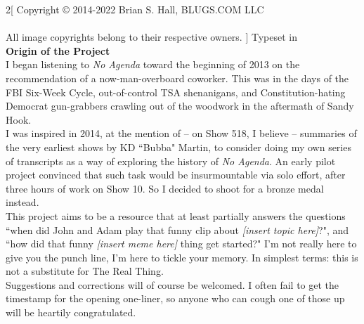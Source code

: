 \begin{multicols*}{2}[
Copyright © 2014-2022 Brian S. Hall, BLUGS.COM LLC\\\\
All image copyrights belong to their respective owners.
]
Typeset in \XeLaTeX\\

\textbf{Origin of the Project}\\

I began listening to \textit{No Agenda} toward the beginning of 2013 on the
recommendation of a now-man-overboard coworker. This was in the days of
the FBI Six-Week Cycle, out-of-control TSA shenanigans, and Constitution-hating
Democrat gun-grabbers crawling out of the woodwork in the aftermath
of Sandy Hook.\\

I was inspired in 2014, at the mention of -- on Show 518, I believe --
summaries of the very earliest shows by KD ``Bubba" Martin,
to consider doing my own series of transcripts
as a way of exploring the history of \textit{No Agenda}. An early pilot project
convinced that such task would be insurmountable via solo effort, after
three hours of work on Show 10. So I decided to shoot for
a bronze medal instead.\\

This project aims to be a resource that at least partially answers the
questions ``when did John and Adam play that funny clip about
\textit{[insert topic here]}?", and ``how did that funny
\textit{[insert meme here]} thing get started?"
I'm not really here to give you the punch line, I'm here to tickle your memory.
In simplest terms: this is not a substitute for The Real Thing.\\

Suggestions and corrections will of course be welcomed. I often fail to get
the timestamp for the opening one-liner, so anyone who can cough one of those
up will be heartily congratulated.


\end{multicols*}
